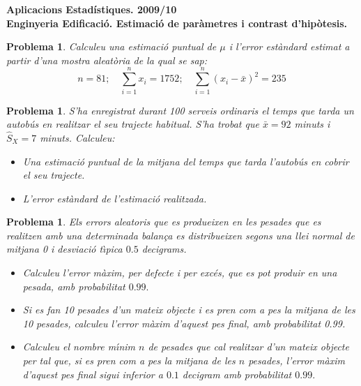 \documentclass[11pt]{article}
\newcounter{prbcont}
\newtheorem{problema}[prbcont]{Problema}
\begin{document}
\begin{center}
\textbf{{\large {Aplicacions Estad\'{i}stiques. 2009/10}\\}}
\vspace{0.5cm}
\textbf{Enginyeria Edificaci\'o. Estimaci\'o de par\`ametres i contrast d'hip\`otesis.}
\end{center}


\begin{problema}
Calculeu una estimaci\'o puntual de $\mu$ i l'error est\`andard estimat a partir d'una mostra
aleat\`oria de la qual se sap:
\[ n = 81;\quad \sum_{i=1}^n x_i = 1752;\quad \sum_{i=1}^n (x_i - \bar{x})^2 = 235 \]
\end{problema}

\begin{problema}
S'ha enregistrat durant 100 serveis ordinaris el temps que tarda un autob\'us en realitzar
el seu trajecte habitual. S'ha trobat que $\bar{x} = 92$ minuts i $\hat{S}_{X} = 7$ minuts. Calculeu:
\begin{itemize}
\item [(a)] Una estimaci\'o puntual de la mitjana del temps que tarda l'autob\'us en cobrir el
seu trajecte.
\item [(b)] L'error est\`andard de l'estimaci\'o realitzada.
\end{itemize}
\end{problema}

\begin{problema}
Els errors aleatoris que es produeixen en les pesades que es realitzen amb una determinada
balan\c{c}a es distribueixen segons una llei normal de mitjana 0 i desviaci\'o t\`{\i}pica
$0.5$ decigrams.
\begin{itemize}
\item [(a)] Calculeu l'error m\`axim, per defecte i per exc\'es, que es pot produir en una pesada,
amb probabilitat $0.99.$ %
\item [(b)] Si es fan 10 pesades d'un mateix objecte i es pren com a pes la mitjana de les 10
pesades, calculeu l'error m\`axim d'aquest pes final, amb probabilitat 0.99. %
\item [(c)] Calculeu el nombre m\'{\i}nim $n$ de pesades que cal realitzar d'un mateix objecte per
tal que, si es pren com a pes la mitjana de les $n$ pesades, l'error m\`axim d'aquest
pes final sigui inferior a $0.1$ decigram amb probabilitat $0.99.$ %
\end{itemize}
\end{problema}
\end{document}

